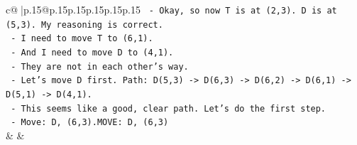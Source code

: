 \documentclass{article}
\begin{document}
{\begin{supertabular}{c@{$\;$}|p{.15\linewidth}@{}p{.15\linewidth}p{.15\linewidth}p{.15\linewidth}p{.15\linewidth}p{.15\linewidth}}
{{{\texttt{   {-} Okay, so now T is at (2,3). D is at (5,3). My reasoning is correct.} \\
\texttt{   {-} I need to move T to (6,1).} \\
\texttt{   {-} And I need to move D to (4,1).} \\
\texttt{   {-} They are not in each other's way.} \\
\texttt{   {-} Let's move D first. Path: D(5,3) {-}> D(6,3) {-}> D(6,2) {-}> D(6,1) {-}> D(5,1) {-}> D(4,1).} \\
\texttt{   {-} This seems like a good, clear path. Let's do the first step.} \\
\texttt{   {-} Move: D, (6,3).MOVE: D, (6,3)} \\
            }
        }
    }
    & & \\ \\


\end{supertabular}}
\end{document}
